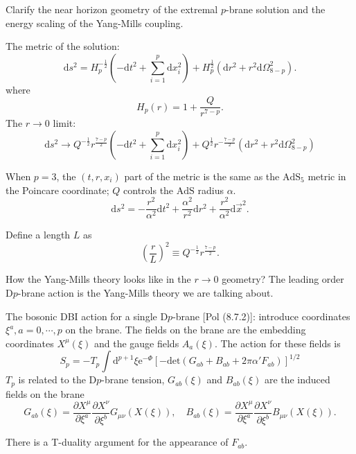 
Clarify the near horizon geometry of the extremal $p$-brane solution
and the energy scaling of the Yang-Mills coupling.

The metric of the solution:
\begin{equation}
	\mathrm{d}s^2 = H_p^{-\frac{1}{2}} \left( - \mathrm{d}t^2
	+ \sum_{i=1}^p \mathrm{d} x_i^2\right) 
	+ H_p^{\frac{1}{2}} \left( \mathrm{d}r^2
	+ r^2 \mathrm{d}\Omega_{8-p}^2\right) .
\end{equation}
where
\[
	H_p(r) = 1 + \frac{Q}{r^{7-p}}
.\] 
The $r\to 0$ limit:
\begin{equation}
	\mathrm{d}s^2 \to Q^{-\frac{1}{2}} r^{\frac{7-p}{2}}
	\left( - \mathrm{d}t^2 + \sum_{i=1}^p \mathrm{d}x_i^2 \right) 
	+ Q^{\frac{1}{2}} r^{-\frac{7-p}{2}} 
	\left( \mathrm{d}r^2 + r^2 \mathrm{d}\Omega_{8-p}^2 \right) 
\end{equation}

When $p=3$, the $(t,r,x_i)$ part of the metric is the same as
the $\mathrm{AdS}_5$ metric in the Poincare coordinate;
$Q$ controls the $\mathrm{AdS}$ radius $\alpha$.
\[
\mathrm{d}s^2 = - \frac{r^2}{\alpha^2}\mathrm{d}t^2
+ \frac{\alpha^2}{r^2} \mathrm{d}r^2
+ \frac{r^2}{\alpha^2} \mathrm{d}\vec{x}^2
.\] 

Define a length $L$ as
\[
	\left( \frac{r}{L} \right)^2  \equiv Q^{-\frac{1}{2}} r^{\frac{7-p}{2}}
.\] 

How the Yang-Mills theory looks like in the $r\to 0$ geometry?
The leading order D$p$-brane action is the Yang-Mills theory we are talking about.

The bosonic DBI action for a single D$p$-brane [Pol (8.7.2)]:
introduce coordinates $\xi^a,a=0,\cdots,p$ on the brane.
The fields on the brane are the embedding coordinates $X^\mu(\xi)$
and the gauge fields $A_a(\xi)$.
The action for these fields is
\begin{equation}
	S_{p} = - T_p \int \mathrm{d}^{p+1} \xi \mathrm{e}^{-\Phi}
	\left[ - \mathrm{det} (G_{ab} + B_{ab} + 2\pi\alpha' F_{ab}) \right] ^{1 / 2}
\end{equation}
$T_p$ is related to the D$p$-brane tension,
$G_{ab}(\xi)$ and $B_{ab}(\xi)$ are the induced fields on the brane
\[
	G_{ab}(\xi) = \frac{\partial X^\mu}{\partial \xi^a} \frac{\partial X^\nu}{\partial \xi^b} G_{\mu\nu}(X(\xi)),\quad
	B_{ab}(\xi) = \frac{\partial X^\mu}{\partial \xi^a}
	\frac{\partial X^\nu}{\partial \xi^b} B_{\mu\nu}(X(\xi))
.\] 

There is a T-duality argument for the appearance of $F_{ab}$.


